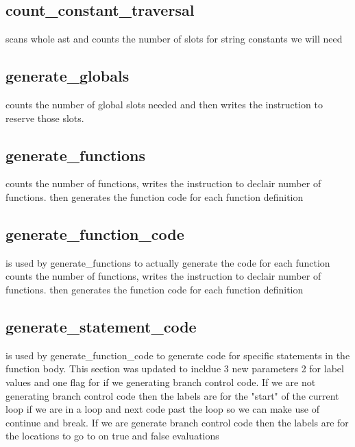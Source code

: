 \documentclass[11pt]{article}
\begin{document}
        \subsection{count\_constant\_traversal}
            scans whole ast and counts the number of slots
            for string constants we will need

        \subsection{generate\_globals}
            counts the number of global slots needed and then writes the 
            instruction to reserve those slots.

        \subsection{generate\_functions}
            counts the number of functions, writes the instruction to declair number
            of functions. then generates the function code for each function definition

        \subsection{generate\_function\_code}
            is used by generate\_functions to actually generate the code for each function
            counts the number of functions, writes the instruction to declair number
            of functions. then generates the function code for each function definition

        \subsection{generate\_statement\_code}
            is used by generate\_function\_code to generate code for specific statements 
            in the function body. This section was updated to incldue 3 new parameters
            2 for label values and one flag for if we generating branch control code.
            If we are not generating branch control code then the labels are for the
            "start" of the current loop if we are in a loop and next code past the
            loop so we can make use of continue and break. If we are generate branch
            control code then the labels are for the locations to go to on true and
            false evaluations
\end{document}
